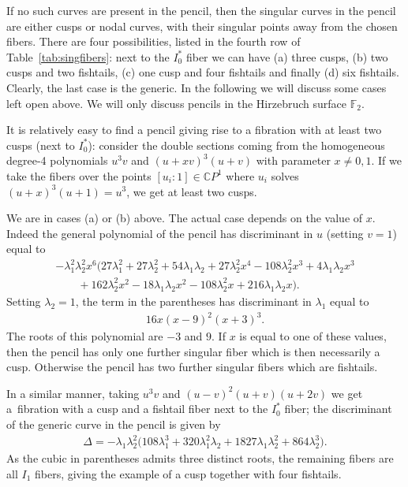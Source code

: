 \documentclass[pdftex]{sigma}
\newcommand{\CP}[1]{\mathbb{C}P^{#1}} %
\numberwithin{equation}{section}
\begin{document}
If no such curves are present in the pencil, then the singular curves
in the pencil are either cusps or nodal curves, with their singular
points away from the chosen fibers. There are four possibilities, listed in the
fourth row of Table~\ref{tab:singfibers}: next
to the $I_0^*$ fiber we can have (a) three cusps, (b) two cusps and two
fishtails, (c) one cusp and four fishtails and finally (d) six
fishtails. Clearly, the last case is the generic. In the following
we will discuss some cases left open above. We will only discuss
pencils in the Hirzebruch surface ${\mathbb {F}}_2$.

\begin{Example}
It is relatively easy to find a pencil giving rise to a fibration with
at least two cusps (next to $I_0^*$): consider the double sections coming from the
homogeneous degree-4 polynomials $u^3v$ and $(u+xv)^3(u+v)$ with parameter $x\neq 0,1$.
If we take the fibers over the points $[u_i:1]\in \CP{1}$ where
$u_i$ solves $(u+x)^3(u+1)=u^3$, we get at least two cusps.

We are in cases (a) or (b) above. The actual case depends on the value
of $x$. Indeed the general polynomial of the pencil has discriminant
in $u$ (setting $v=1$) equal to
\begin{gather*}
-\lambda _1^2 \lambda _2^2 x^6 \big(27 \lambda _1^2+27 \lambda _2^2+54 \lambda _1 \lambda _2+27 \lambda _2^2 x^4-108 \lambda _2^2 x^3+4 \lambda _1 \lambda _2 x^3 \\
\qquad{} +162 \lambda _2^2 x^2-18 \lambda _1 \lambda _2 x^2-108 \lambda _2^2 x+216 \lambda _1 \lambda _2 x\big).
\end{gather*}
Setting $\lambda _2=1$, the term in the parentheses has discriminant in $\lambda_1$ equal to
\begin{gather*}
	16 x (x-9)^2 (x+3)^3.
\end{gather*}
The roots of this polynomial are $-3$ and $9$. If $x$ is equal to one of these values, then the pencil has only one further singular fiber which is then necessarily a cusp. Otherwise the pencil has two further singular fibers which are fishtails.
\end{Example}

\begin{Example} In a similar manner, taking $u^3v$ and $(u-v)^2(u+v)(u+2v)$ we get a~fibration with a cusp and a fishtail fiber next to the $I_0^*$ fiber;
the discriminant of the generic curve in the pencil is given by
\begin{gather*}
 \Delta = - \lambda_1 \lambda_2^2 \big(108 \lambda_1^3 + 320 \lambda_1^2 \lambda_2 + 1827 \lambda_1 \lambda_2^2 + 864 \lambda_2^3\big).
\end{gather*}
As the cubic in parentheses admits three distinct roots, the remaining fibers are all $I_1$ fibers, giving the example of a cusp together with four fishtails.
\end{Example}
\end{document}
